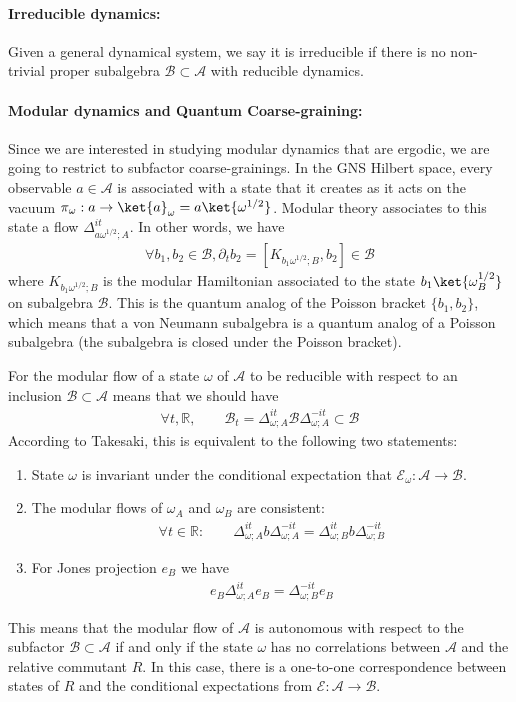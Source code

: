 \documentclass[a4paper,11pt]{article}
\theoremstyle{definition}
\newcommand{\mA}{\mathcal{A}}
\newcommand{\mB}{\mathcal{B}}
\newcommand{\mE}{\mathcal{E}}
\begin{document}
\paragraph{Irreducible dynamics:} Given a general dynamical system, we say it is irreducible if there is no non-trivial proper subalgebra $\mB\subset \mA$ with reducible dynamics.


\paragraph{Modular dynamics and Quantum Coarse-graining:} Since we are interested in studying modular dynamics that are ergodic, we are going to restrict to subfactor coarse-grainings. In the GNS Hilbert space, every observable $a\in \mA$ is associated with a state that it creates as it acts on the vacuum $\pi_\omega:a\to \ket{a}_\omega=a\ket{\omega^{1/2}}$. Modular theory associates to this state a flow $\Delta_{a\omega^{1/2};A}^{it}$. In other words, we have
\begin{align}
    \forall b_1,b_2\in \mB, \partial_t b_2=[K_{b_1\omega^{1/2};B},b_2]\in \mB
\end{align}
where $K_{b_1\omega^{1/2};B}$ is the modular Hamiltonian associated to the state $b_1\ket{\omega_B^{1/2}}$ on subalgebra $\mB$. This is the quantum analog of the Poisson bracket $\{b_1,b_2\}$, which means that a von Neumann subalgebra is a quantum analog of a Poisson subalgebra (the subalgebra is closed under the Poisson bracket). 

For the modular flow of a state $\omega$ of $\mA$ to be reducible with respect to an inclusion $\mB\subset \mA$ means that we should have
\begin{align}
    \forall t,\mathbb{R}, \qquad \mB_t=\Delta_{\omega;A}^{it}\mB\Delta_{\omega;A}^{-it}\subset \mB
\end{align}
According to Takesaki, this is equivalent to the following two statements:
\begin{enumerate}
\item State $\omega$ is invariant under the conditional expectation that $\mE_\omega:\mA\to \mB$.

\item The modular flows of $\omega_A$ and $\omega_B$ are consistent:
\begin{align}
\forall t\in\mathbb{R}:\qquad    \Delta_{\omega;A}^{it}b\Delta_{\omega;A}^{-it}=\Delta_{\omega;B}^{it}b\Delta_{\omega;B}^{-it}
\end{align}   

\item For Jones projection $e_B$ we have
\begin{align}
    e_B\Delta_{\omega;A}^{it}e_B=\Delta_{\omega;B}^{-it}e_B
\end{align}
\end{enumerate}
This means that the modular flow of $\mA$ is autonomous with respect to the subfactor $\mB\subset \mA$ if and only if the state $\omega$ has no correlations between $\mA$ and the relative commutant $R$. In this case, there is a one-to-one correspondence between states of $R$ and the conditional expectations from $\mE:\mA\to \mB$. 
\end{document}
